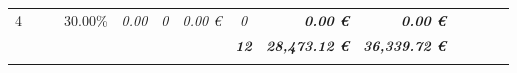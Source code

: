 \begin{table}[]
\begin{tabular}{cllllrrrcrrrrrr}
4                                                                                       & \multicolumn{2}{l}{\cellcolor[HTML]{FFFF99}\textit{}}                                & \cellcolor[HTML]{FFFF99}                            & \multicolumn{1}{r}{\cellcolor[HTML]{FFFF99}30.00\%} & \cellcolor[HTML]{FFFF99}\textit{0.00}                             & \cellcolor[HTML]{FFFF99}\textit{0}                         & \textit{0.00 €}                                              & \cellcolor[HTML]{FFFF99}\textit{0}                        & \cellcolor[HTML]{92D050}\textit{\textbf{0.00 €}}                         & \cellcolor[HTML]{FFFF99}\textit{\textbf{0.00 €}}                              & \cellcolor[HTML]{92D050}\textit{}                     & \cellcolor[HTML]{FFFF99}\textit{}                     & \cellcolor[HTML]{BFBFBF}\textit{\textbf{}}                        & \textit{\textbf{}}                                             \\
\rowcolor[HTML]{0070C0} 
\multicolumn{1}{l}{\cellcolor[HTML]{0070C0}{\color[HTML]{FFFFFF} \textbf{Gesamtsumme}}} & \multicolumn{2}{l}{\cellcolor[HTML]{0070C0}\textit{}}                                &                                                     &                                                     & \multicolumn{1}{l}{\cellcolor[HTML]{0070C0}\textit{}}             & \multicolumn{1}{l}{\cellcolor[HTML]{0070C0}\textit{}}      & \multicolumn{1}{l}{\cellcolor[HTML]{0070C0}\textit{}}        & {\color[HTML]{FFFFFF} \textit{\textbf{12}}}               & {\color[HTML]{FFFFFF} \textit{\textbf{28,473.12 €}}}                     & {\color[HTML]{FFFFFF} \textit{\textbf{36,339.72 €}}}                          & \multicolumn{1}{l}{\cellcolor[HTML]{0070C0}\textit{}} & {\color[HTML]{FFFFFF} \textit{\textbf{}}}             & {\color[HTML]{FFFFFF} \textit{\textbf{}}}                         & {\color[HTML]{FFFFFF} \textit{\textbf{}}}                      \\
                                                                                        & \multicolumn{2}{c}{\cellcolor[HTML]{FFFF99}\textit{}}                                & \cellcolor[HTML]{FFFF99}                            & \multicolumn{1}{c}{\cellcolor[HTML]{FFFF99}}        & \cellcolor[HTML]{FFFF99}\textit{}                                 & \textit{}                                                  & \textit{}                                                    & \multicolumn{1}{r}{\cellcolor[HTML]{FFFF99}\textit{}}     & \cellcolor[HTML]{92D050}\textit{}                                        &                                                                               & \cellcolor[HTML]{92D050}\textit{}                     & \cellcolor[HTML]{FFFF99}\textit{}                     & \cellcolor[HTML]{BFBFBF}\textit{\textbf{}}                        & \textit{\textbf{}}                                             \\

\end{tabular}
\end{table}
